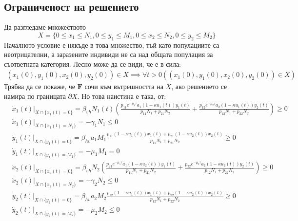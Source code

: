 \subsection{Ограниченост на решението}
Да разгледаме множеството
\begin{equation}
  X = \{0 \leq x_1 \leq N_1, 0 \leq y_1 \leq M_1, 0 \leq x_2 \leq N_2, 0 \leq y_2 \leq M_2\}
\end{equation}
Началното условие е някъде в това множество, тъй като популациите са неотрицателни, а заразените индивиди не са над общата популация за съответната категория. Лесно може да се види, че е в сила:
\begin{align}
  (x_1(0), y_1(0), x_2(0), y_2(0)) \in X \implies \forall{t>0}\left((x_1(0), y_1(0), x_2(0), y_2(0)) \in X\right)
\end{align}
Трябва да се покаже, че $\mathbf{F}$ сочи към вътрешността на $X$, ако решението се намира по границата $\partial X$. Но това наистина е така, от:
\begin{align*}
  &\dot{x}_1(t)\vert_{X \cap \{x_1(t)=0\}} = \beta_{vh} N_1(t) \left(\frac{p_{11} e^{-\mu_1 \tau} a_1 (1-\kappa u_1(t)) y_1(t)}{p_{11} N_1 + p_{21} N_2} + \frac{p_{12} e^{-\mu_2 \tau} a_2 (1-\kappa u_1(t)) y_2(t)}{p_{12} N_1 + p_{22} N_2 }\right) \geq 0 \\
  &\dot{x}_1(t)\vert_{X \cap \{x_1(t)=N_1\}} = - \gamma_1 N_1 \leq 0 \\
  &\dot{y}_1(t)\vert_{X \cap \{y_1(t)=0\}} = \beta_{hv} a_1 M_1 \frac{p_{11} (1-\kappa u_1(t)) x_1(t) + p_{21} (1-\kappa u_2(t)) x_2(t)}{p_{11} N_1 + p_{21} N_2} \geq 0 \\
  &\dot{y}_1(t)\vert_{X \cap \{y_1(t)=M_1\}} = - \mu_1 M_1 = 0 \\
  &\dot{x}_2(t)\vert_{X \cap \{x_2(t)=0\}} = \beta_{vh} N_2 \left(\frac{p_{21} e^{-\mu_1 \tau} a_1 (1-\kappa u_2(t)) y_1(t)}{p_{11} N_1 + p_{21} N_2} + \frac{p_{22} e^{-\mu_2 \tau} a_2 (1-\kappa u_2(t)) y_2(t)}{p_{12} N_1 + p_{22} N_2}\right) \geq 0 \\
  &\dot{x}_2(t)\vert_{X \cap \{x_2(t)=N_2\}} = - \gamma_2 N_2 \leq 0 \\
  &\dot{y}_2(t)\vert_{X \cap \{y_2(t)=0\}} = \beta_{hv} a_2 M_2 \frac{p_{12} (1-\kappa u_1(t)) x_1(t) + p_{22} (1-\kappa u_2(t)) x_2(t)}{p_{12} N_1 + p_{22} N_2} \geq 0 \\
  &\dot{y}_2(t)\vert_{X \cap \{y_2(t)=M_2\}} = - \mu_2 M_2 \leq 0
\end{align*}


